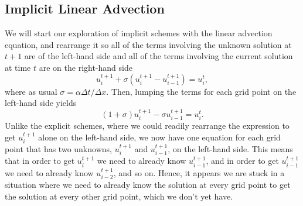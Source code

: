 \subsection{Implicit Linear Advection}
We will start our exploration of implicit schemes with the linear advection equation, and rearrange it so all of the terms involving the unknown solution at $t+1$ are of the left-hand side and all of the terms involving the current solution at time $t$ are on the right-hand side
\begin{equation}
	u_i^{t+1} + \sigma \left(u_i^{t+1} - u_{i-1}^{t+1} \right) = u_i^{t},
\end{equation}
where as usual $\sigma = \alpha \Delta t/ \Delta x$. Then, lumping the terms for each grid point on the left-hand side yields
\begin{equation}
	\label{eqn:sh4k18g9}
	(1+\sigma) u_i^{t+1} - \sigma u_{i-1}^{t+1} = u_i^{t}.
\end{equation}
Unlike the explicit schemes, where we could readily rearrange the expression to get $u_i^{t+1}$ alone on the left-hand side, we now have one equation for each grid point that has two unknowns, $u_i^{t+1}$ and $u_{i-1}^{t+1}$, on the left-hand side. This means that in order to get $u_i^{t+1}$ we need to already know $u_{i-1}^{t+1}$, and in order to get $u_{i-1}^{t+1}$ we need to already know $u_{i-2}^{t+1}$, and so on. Hence, it appears we are stuck in a situation where we need to already know the solution at every grid point to get the solution at every other grid point, which we don't yet have.

